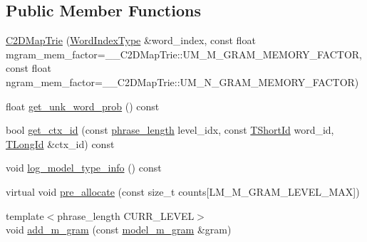 \subsection*{Public Member Functions}
\begin{DoxyCompactItemize}
\item 
\hyperlink{classuva_1_1smt_1_1bpbd_1_1server_1_1lm_1_1_c2_d_map_trie_ae3613f90d14b2614a157b824ee6720e8}{C2\+D\+Map\+Trie} (\hyperlink{classuva_1_1smt_1_1bpbd_1_1server_1_1lm_1_1_word_index_trie_base_a77ee32bf3a9f8a89558bda4f2031200c}{Word\+Index\+Type} \&word\+\_\+index, const float mgram\+\_\+mem\+\_\+factor=\+\_\+\+\_\+\+C2\+D\+Map\+Trie\+::\+U\+M\+\_\+\+M\+\_\+\+G\+R\+A\+M\+\_\+\+M\+E\+M\+O\+R\+Y\+\_\+\+F\+A\+C\+T\+O\+R, const float ngram\+\_\+mem\+\_\+factor=\+\_\+\+\_\+\+C2\+D\+Map\+Trie\+::\+U\+M\+\_\+\+N\+\_\+\+G\+R\+A\+M\+\_\+\+M\+E\+M\+O\+R\+Y\+\_\+\+F\+A\+C\+T\+O\+R)
\item 
float \hyperlink{classuva_1_1smt_1_1bpbd_1_1server_1_1lm_1_1_c2_d_map_trie_ab4860008978bf4b96d3f2d34c59feb18}{get\+\_\+unk\+\_\+word\+\_\+prob} () const 
\item 
bool \hyperlink{classuva_1_1smt_1_1bpbd_1_1server_1_1lm_1_1_c2_d_map_trie_aaa55caae87b60c6d7e87f11db4e61cae}{get\+\_\+ctx\+\_\+id} (const \hyperlink{namespaceuva_1_1smt_1_1bpbd_1_1server_af068a19c2e03116caf3e3827a3e40e35}{phrase\+\_\+length} level\+\_\+idx, const \hyperlink{namespaceuva_1_1smt_1_1bpbd_1_1server_1_1lm_1_1identifiers_a33043a191e9a637dea742a89d23c8bdc}{T\+Short\+Id} word\+\_\+id, \hyperlink{namespaceuva_1_1smt_1_1bpbd_1_1server_1_1lm_1_1identifiers_a6841847096e455ad3c38689bc548b3b0}{T\+Long\+Id} \&ctx\+\_\+id) const 
\item 
void \hyperlink{classuva_1_1smt_1_1bpbd_1_1server_1_1lm_1_1_c2_d_map_trie_a4cf1e9ba5fcc701748f09b2cb1bcc9f5}{log\+\_\+model\+\_\+type\+\_\+info} () const 
\item 
virtual void \hyperlink{classuva_1_1smt_1_1bpbd_1_1server_1_1lm_1_1_c2_d_map_trie_aec72c8a7a6460142ec37bad475617fec}{pre\+\_\+allocate} (const size\+\_\+t counts\mbox{[}L\+M\+\_\+\+M\+\_\+\+G\+R\+A\+M\+\_\+\+L\+E\+V\+E\+L\+\_\+\+M\+A\+X\mbox{]})
\item 
{\footnotesize template$<$phrase\+\_\+length C\+U\+R\+R\+\_\+\+L\+E\+V\+E\+L$>$ }\\void \hyperlink{classuva_1_1smt_1_1bpbd_1_1server_1_1lm_1_1_c2_d_map_trie_a1e65bcc668d1906bc83ce1621ab00a1e}{add\+\_\+m\+\_\+gram} (const \hyperlink{classuva_1_1smt_1_1bpbd_1_1server_1_1lm_1_1m__grams_1_1model__m__gram}{model\+\_\+m\+\_\+gram} \&gram)
\item 

\end{DoxyCompactItemize}
